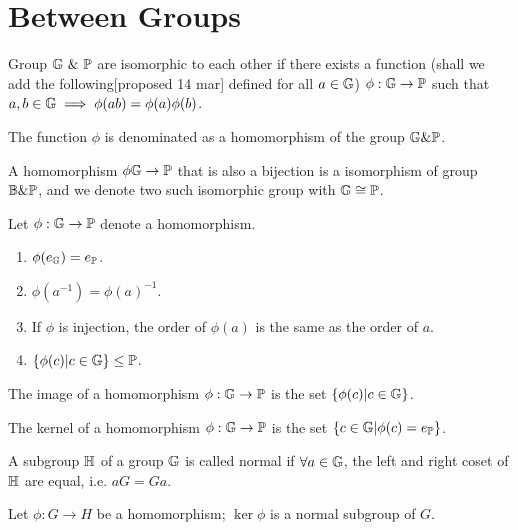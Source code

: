 \documentclass[../note.tex]{subfiles}
\begin{document}
\section{Between Groups}

\begin{definition}[Homomorphism]
	Group $\mathbb{G}\ \& \ \mathbb{P}$ are isomorphic to each other if there exists a function (shall we add the following[proposed 14 mar]  defined for all $a \in \mathbb{G}$)
	$\phi: \mathbb{G}\rightarrow \mathbb{P}$ such that	$ a, b \in \mathbb{G} \implies \phi(ab) = \phi(a)\phi(b)$.

	The function $\phi$ is denominated as a homomorphism of the group $\mathbb{G}\&\mathbb{P}$.
\end{definition}

\begin{definition}[Isomorphism]
	A homomorphism $\phi \mathbb{G} \rightarrow \mathbb{P}$ that is also a bijection is a isomorphism of group $\mathbb{B}\&\mathbb{P}$, and we denote two such isomorphic group with $\mathbb{G} \cong \mathbb{P}$.
\end{definition}

\begin{proposition}
	Let $\phi: \mathbb{G} \rightarrow \mathbb{P}$ denote a homomorphism. 
\begin{enumerate}
	\item $\phi(e_{\mathbb{G}}) = e_{\mathbb{P}}$. 
	\item $\phi(a^{-1}) = \phi(a)^{-1}$.
	\item If $\phi$ is injection, the order of $\phi(a)$ is the same as the order of $a$.
	\item $\{\phi(c) |c \in \mathbb{G}\}\leq \mathbb{P}$.
\end{enumerate}
\end{proposition}

\begin{definition}[Image]
	The image of a homomorphism $\phi: \mathbb{G} \rightarrow \mathbb{P}$ is the set $\{\phi(c) |c \in \mathbb{G}\}$.
\end{definition}
\begin{definition}[Kernel] 
	The kernel of a homomorphism $\phi: \mathbb{G} \rightarrow \mathbb{P}$ is the set $\{c \in \mathbb{G} | \phi(c) = e_{\mathbb{P}}\}$.
\end{definition}

\begin{definition}
	A subgroup $\mathbb{H}$ of a group $\mathbb{G}$ is called normal if $\forall a \in \mathbb{G}$, the left and right coset of $\mathbb{H}$ are equal, i.e. $aG=Ga$.
\end{definition}

\begin{proposition}
	Let	$\phi : G \rightarrow H$ be a homomorphism; $\ker{\phi}$ is a normal subgroup of $G$. 
\end{proposition}
\end{document}
